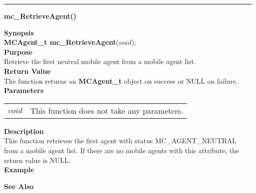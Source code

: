 \noindent
\vspace{5pt}
\rule{6.5in}{0.015in}
\noindent
{\LARGE \bf mc\_RetrieveAgent()}\\
{}

\noindent
{\bf Synopsis}\\
{\bf MCAgent\_t mc\_RetrieveAgent}($void$);\\

\noindent
{\bf Purpose}\\
Retrieve the first neutral mobile agent from a mobile agent list.\\

\noindent
{\bf Return Value}\\
The function returns an {\bf MCAgent\_t} object on success or NULL on failure.\\

\noindent
{\bf Parameters}
\vspace{-0.1in}
\begin{description}
\item               
\begin{tabular}{p{10 mm}p{145 mm}}
$void$ & This function does not take any parameters.
\end{tabular}
\end{description}

\noindent
{\bf Description}\\
This function retrieves the first agent with status MC\_AGENT\_NEUTRAL from a 
mobile agent list. 
If there are no mobile agents with this attribute, the return value is NULL.\\

\noindent
{\bf Example}\\
\noindent

\noindent
{\bf See Also}\\

